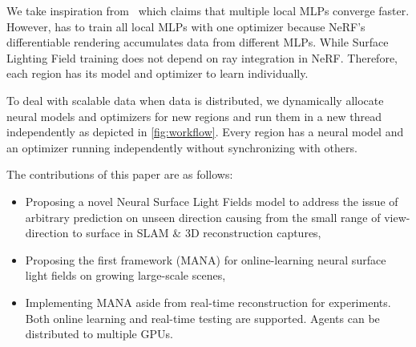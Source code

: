 We take inspiration from~\cite{reiser2021kilonerf} which claims that multiple local MLPs converge faster. 
However, \cite{reiser2021kilonerf} has to train all local MLPs with one optimizer because NeRF's differentiable rendering accumulates data from different MLPs. 
While Surface Lighting Field training does not depend on ray integration in NeRF. Therefore, each region has its model and optimizer to learn individually.

To deal with scalable data when data is distributed, we dynamically allocate neural models and optimizers for new regions and run them in a new thread independently as depicted in \cref{fig:workflow}.
Every region has a neural model and an optimizer running independently without synchronizing with others.

The contributions of this paper are as follows:
\begin{itemize}
\item
  Proposing a novel Neural Surface Light Fields model to address the issue of arbitrary prediction on unseen direction causing from the small range of view-direction to surface in SLAM \& 3D reconstruction captures,
\item
  Proposing the first framework (MANA) for online-learning neural surface light fields on growing large-scale scenes,
\item
  Implementing MANA aside from real-time reconstruction for experiments.
  Both online learning and real-time testing are supported.
  Agents can be distributed to multiple GPUs.
\end{itemize}

